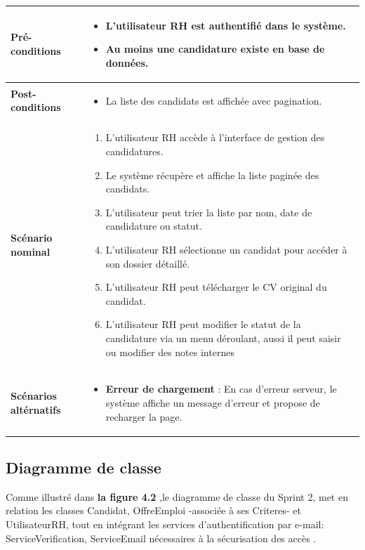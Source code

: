 \documentclass[12pt,a4paper,oneside]{report}
\begin{document}
\begin{itemize}
\begin{xltabular}{\textwidth}{|l|X|}
    \textbf{Pré-conditions} & 
    \begin{itemize}[leftmargin=*, nosep]
        \item L'utilisateur RH est authentifié dans le système.
        \item Au moins une candidature existe en base de données.
    \end{itemize} \\ \hline

    \textbf{Post-conditions} & 
    \begin{itemize}[leftmargin=*, nosep]
        \item La liste des candidats est affichée avec pagination.
    \end{itemize} \\ \hline
    
    \textbf{Scénario nominal} & 
    \begin{enumerate}[leftmargin=*, nosep]
        \item L'utilisateur RH accède à l'interface de gestion des candidatures.
        \item Le système récupère et affiche la liste paginée des candidats.
        \item L'utilisateur peut trier la liste par nom, date de candidature ou statut.
        \item L'utilisateur RH sélectionne un candidat pour accéder à son dossier détaillé.
        \item L'utilisateur RH peut télécharger le CV original du candidat.
        \item L'utilisateur RH peut modifier le statut de la candidature via un menu déroulant, aussi il peut saisir ou modifier des notes internes 

    \end{enumerate} \\ \hline
    
    \textbf{Scénarios altérnatifs} & 
    \begin{itemize}[leftmargin=*, nosep]
        \item \textbf{Erreur de chargement} : En cas d'erreur serveur, le système affiche un message d'erreur et propose de recharger la page.
    \end{itemize} \\ \hline
\end{xltabular}


\subsection{Diagramme de classe}
Comme illustré dans \textbf{la figure 4.2} ,le diagramme de classe du Sprint 2, met en relation les classes Candidat, OffreEmploi -associée à ses Criteres- et UtilisateurRH, tout en intégrant les services d'authentification par e-mail: ServiceVerification, ServiceEmail nécessaires à la sécurisation des accès .


\end{itemize}
\end{document}
